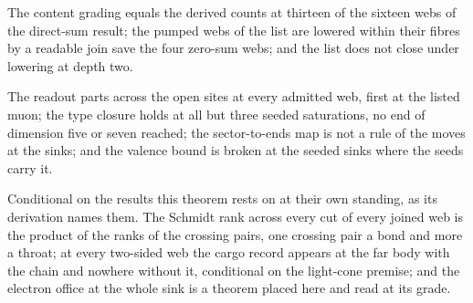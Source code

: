 \begin{chwall}\label{box:I-5-saturation-in-one-figure-seeds-waves-termination-sinks:7}
The content grading equals the derived counts at thirteen of the sixteen webs of the direct-sum result; the pumped webs of the list are lowered within their fibres by a readable join save the four zero-sum webs; and the list does not close under lowering at depth two.
\end{chwall}
\begin{chwall}\label{box:I-5-saturation-in-one-figure-seeds-waves-termination-sinks:8}
The readout parts across the open sites at every admitted web, first at the listed muon; the type closure holds at all but three seeded saturations, no end of dimension five or seven reached; the sector-to-ends map is not a rule of the moves at the sinks; and the valence bound is broken at the seeded sinks where the seeds carry it.
\end{chwall}
\begin{chconditional}\label{box:I-5-saturation-in-one-figure-seeds-waves-termination-sinks:9}
Conditional on the results this theorem rests on at their own standing, as its derivation names them.
The Schmidt rank across every cut of every joined web is the product of the ranks of the crossing pairs, one crossing pair a bond and more a throat; at every two-sided web the cargo record appears at the far body with the chain and nowhere without it, conditional on the light-cone premise; and the electron office at the whole sink is a theorem placed here and read at its grade.
\end{chconditional}

